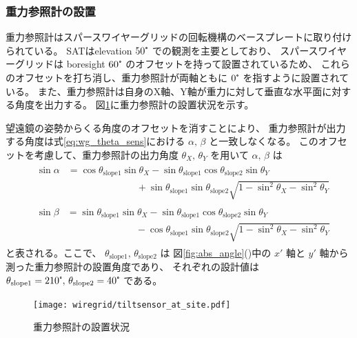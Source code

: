 \documentclass[../../main.tex]{subfiles}
\begin{document}
\subsubsection{重力参照計の設置}
\label{subsubsec:wg_tiltsensor_slope}
重力参照計はスパースワイヤーグリッドの回転機構のベースプレートに取り付けられている。
SATはelevation $50\tcdegree$ での観測を主要としており、
スパースワイヤーグリッドは boresight $60\tcdegree$ のオフセットを持って設置されているため、
これらのオフセットを打ち消し、重力参照計が両軸ともに $0\tcdegree$ を指すように設置されている。
また、重力参照計は自身のX軸、Y軸が重力に対して垂直な水平面に対する角度を出力する。
図\ref{fig:tiltsensor_at_site}に重力参照計の設置状況を示す。

望遠鏡の姿勢からくる角度のオフセットを消すことにより、
重力参照計が出力する角度は式\eqref{eq:wg_theta_sens}における $\alpha,\,\beta$ と一致しなくなる。
このオフセットを考慮して、重力参照計の出力角度 $\theta_{X},\,\theta_{Y}$ を用いて $\alpha,\,\beta$ は
\begin{align}
    &\begin{split}
        \sin\alpha &= \cos\theta_{\mathrm{slope}1}\sin\theta_{X}-\sin\theta_{\mathrm{slope}1}\cos\theta_{\mathrm{slope}2}\sin\theta_{Y} \\
                   &\hspace{3cm} +\sin\theta_{\mathrm{slope}1}\sin\theta_{\mathrm{slope}2}\sqrt{1-\sin^2\theta_{X}-\sin^2\theta_{Y}}
    \end{split} \\
    &\begin{split}
        \sin\beta &= \sin\theta_{\mathrm{slope}1}\sin\theta_{X}-\sin\theta_{\mathrm{slope}1}\cos\theta_{\mathrm{slope}2}\sin\theta_{Y} \\
                  &\hspace{3cm}-\cos\theta_{\mathrm{slope}1}\sin\theta_{\mathrm{slope}2}\sqrt{1-\sin^2\theta_{X}-\sin^2\theta_{Y}}
    \end{split}
\end{align}
と表される。ここで、 $\theta_{\mathrm{slope}1},\,\theta_{\mathrm{slope}2}$ は
図\ref{fig:abs_angle}()中の $x'$ 軸と $y'$ 軸から測った重力参照計の設置角度であり、
それぞれの設計値は $\theta_{\mathrm{slope}1}=210\tcdegree,\,\theta_{\mathrm{slope}2}=40\tcdegree$ である。
\begin{figure}[H]
    \centering
    \texttt{[image: wiregrid/tiltsensor\_at\_site.pdf]}
    \caption{重力参照計の設置状況}
    \label{fig:tiltsensor_at_site}
\end{figure}
\end{document}
